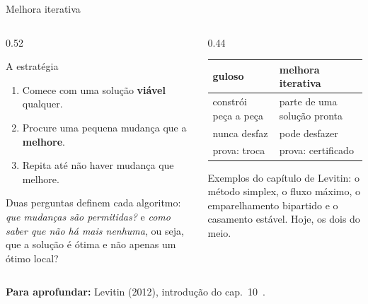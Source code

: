 \documentclass[aspectratio=169,xcolor=table]{beamer}
\newcommand{\fonte}[1]{%
  \vfill
  {\tiny\color{gray!55!black}\textbf{Para aprofundar:} #1\par}%
}
\begin{document}
\begin{frame}{Melhora iterativa}
  \begin{columns}[c]
    \begin{column}{0.52\textwidth}
      \begin{block}{A estratégia}
        \small
        \begin{enumerate}
          \item Comece com uma solução \textbf{viável} qualquer.
          \item Procure uma pequena mudança que a \textbf{melhore}.
          \item Repita até não haver mudança que melhore.
        \end{enumerate}
      \end{block}
      \scriptsize
      Duas perguntas definem cada algoritmo: \emph{que mudanças são permitidas?} e
      \emph{como saber que não há mais nenhuma}, ou seja, que a solução é ótima e não apenas
      um ótimo local?
    \end{column}
    \begin{column}{0.44\textwidth}
      \scriptsize
      \centering
      \begin{tabular}{ll}
        \toprule
        guloso & melhora iterativa \\
        \midrule
        constrói peça a peça & parte de uma solução pronta \\
        nunca desfaz & pode desfazer \\
        prova: troca & prova: certificado \\
        \bottomrule
      \end{tabular}
      \medskip

      \raggedright
      Exemplos do capítulo de Levitin: o método simplex, o fluxo máximo, o emparelhamento
      bipartido e o casamento estável. Hoje, os dois do meio.
    \end{column}
  \end{columns}
  \fonte{Levitin (2012), introdução do cap.~10~\cite{levitin2012introduction}.}
\end{frame}
\end{document}
